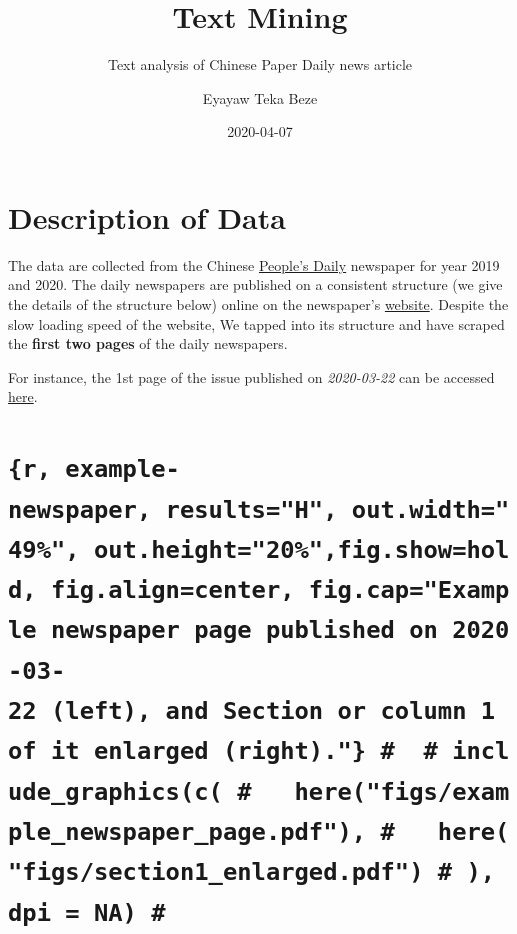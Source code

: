 \documentclass[
  12pt,
]{article}
\title{Text Mining}
\subtitle{Text analysis of Chinese Paper Daily news article}
\author{Eyayaw Teka Beze}
\date{2020-04-07}
\begin{document}
\maketitle

{
\hypersetup{linkcolor=}
\setcounter{tocdepth}{2}
\tableofcontents
}
\hypertarget{description-of-data}{%
\section{Description of Data}\label{description-of-data}}

The data are collected from the Chinese \href{https://en.wikipedia.org/wiki/People\%27s_Daily}{People's Daily} newspaper for year 2019 and 2020. The daily newspapers are published on a consistent structure (we give the details of the structure below) online on the newspaper's \href{paper.people.com.cn}{website}. Despite the slow loading speed of the website, We tapped into its structure and have scraped the \textbf{first two pages} of the daily newspapers.

For instance, the 1st page of the issue published on \emph{2020-03-22} can be accessed \href{http://paper.people.com.cn/rmrb/html/2020-03/22/nbs.D110000renmrb_01.htm}{here}.

\hypertarget{r-example-newspaper-resultsh-out.width49-out.height20fig.showhold-fig.aligncenter-fig.capexample-newspaper-page-published-on-2020-03-22-left-and-section-or-column-1-of-it-enlarged-right.-include_graphicsc-herefigsexample_newspaper_page.pdf-herefigssection1_enlarged.pdf-dpi-na}{%
\section{\texorpdfstring{\texttt{\{r,\ example-newspaper,\ results="H",\ out.width="49\%",\ out.height="20\%",fig.show=\textquotesingle{}hold\textquotesingle{},\ fig.align=\textquotesingle{}center\textquotesingle{},\ fig.cap="Example\ newspaper\ page\ published\ on\ 2020-03-22\ (left),\ and\ Section\ or\ column\ 1\ of\ it\ enlarged\ (right)."\}\ \#\ \ \#\ include\_graphics(c(\ \#\ \ \ here("figs/example\_newspaper\_page.pdf"),\ \#\ \ \ here("figs/section1\_enlarged.pdf")\ \#\ ),\ dpi\ =\ NA)\ \#}}{\{r, example-newspaper, results="H", out.width="49\%", out.height="20\%",fig.show='hold', fig.align='center', fig.cap="Example newspaper page published on 2020-03-22 (left), and Section or column 1 of it enlarged (right)."\} \#  \# include\_graphics(c( \#   here("figs/example\_newspaper\_page.pdf"), \#   here("figs/section1\_enlarged.pdf") \# ), dpi = NA) \#}}\label{r-example-newspaper-resultsh-out.width49-out.height20fig.showhold-fig.aligncenter-fig.capexample-newspaper-page-published-on-2020-03-22-left-and-section-or-column-1-of-it-enlarged-right.-include_graphicsc-herefigsexample_newspaper_page.pdf-herefigssection1_enlarged.pdf-dpi-na}}
\end{document}
